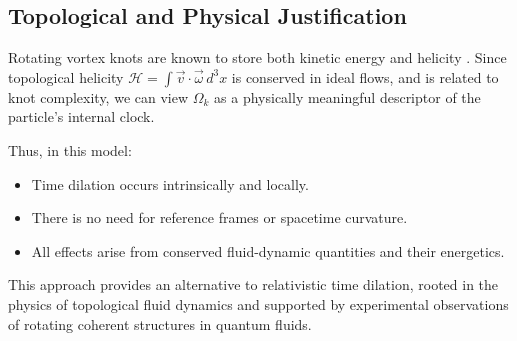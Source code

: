 \subsection{Topological and Physical Justification}

Rotating vortex knots are known to store both kinetic energy and helicity \cite{moffatt1969degree, knottedvortices2012kleckner}. Since topological helicity $\mathcal{H} = \int \vec{v} \cdot \vec{\omega} \, d^3x$ is conserved in ideal flows, and is related to knot complexity, we can view $\Omega_k$ as a physically meaningful descriptor of the particle’s internal clock.

Thus, in this model:
\begin{itemize}
    \item Time dilation occurs intrinsically and locally.
    \item There is no need for reference frames or spacetime curvature.
    \item All effects arise from conserved fluid-dynamic quantities and their energetics.
\end{itemize}

This approach provides an alternative to relativistic time dilation, rooted in the physics of topological fluid dynamics and supported by experimental observations of rotating coherent structures in quantum fluids.